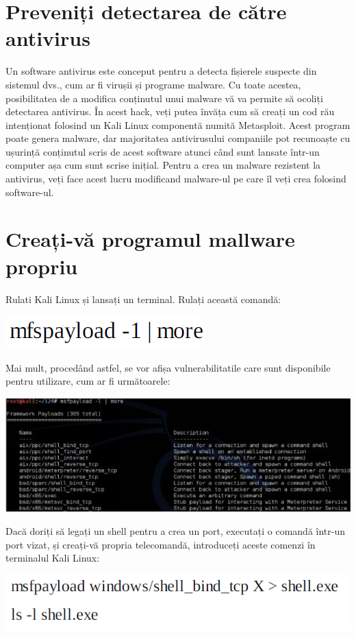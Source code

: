 \documentclass[oneside,20pt]{article}          %
\begin{document}
\section{Preveniți detectarea de către antivirus}
Un software antivirus este conceput pentru a detecta fișierele suspecte din sistemul dvs., cum ar fi virușii și
programe malware. Cu toate acestea, posibilitatea de a modifica conținutul unui malware vă va permite să ocoliți
detectarea antivirus.
În acest hack, veți putea învăța cum să creați un cod rău intenționat folosind un Kali Linux
componentă numită Metasploit. Acest program poate genera malware, dar majoritatea antivirusului
companiile pot recunoaște cu ușurință conținutul scris de acest software atunci când sunt lansate într-un
computer așa cum sunt scrise inițial. Pentru a crea un malware rezistent la antivirus, veți face acest lucru
 modificand malware-ul pe care îl veți crea folosind software-ul.
\section{Creați-vă programul mallware propriu}
Rulati Kali Linux și lansați un terminal. Rulați această comandă:
\begin{center}
\includegraphics[height=0.5 cm]{21.png}
\end{center}
Mai mult, procedând astfel, se vor afișa vulnerabilitatile care sunt disponibile pentru utilizare, cum ar fi următoarele:
\begin{center}
\includegraphics[height=4 cm]{8.png}
\end{center}
Dacă doriți să legați un shell pentru a crea un port, executați o comandă într-un port vizat,
și creați-vă propria telecomandă, introduceți aceste comenzi în terminalul Kali Linux:
\begin{center}
\includegraphics[height=0.5 cm]{8.1.png}
\end{center}
\end{document}
